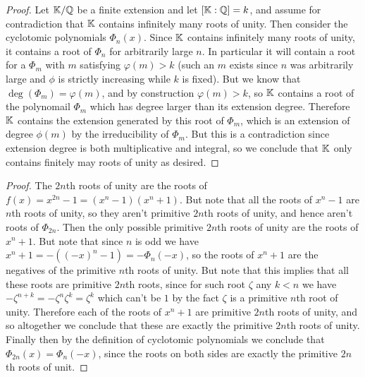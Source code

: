 \documentclass[11pt]{article}
\begin{document}
\begin{proof}
  Let $\mathbb{K}/\mathbb{Q}$ be a finite extension and let $[\mathbb{K}:\mathbb{Q}] = k$, and assume for contradiction that $\mathbb{K}$ contains infinitely many roots of unity.
  Then consider the cyclotomic polynomials $\Phi_n(x)$.
  Since $\mathbb{K}$ contains infinitely many roots of unity, it contains a root of $\Phi_n$ for arbitrarily large $n$.
  In particular it will contain a root for a $\Phi_m$ with $m$ satisfying $\varphi(m) > k$ (such an $m$ exists since $n$ was arbitrarily large and $\phi$ is strictly increasing while $k$ is fixed).
  But we know that $\deg(\Phi_m) = \varphi(m)$, and by construction $\varphi(m) > k$, so $\mathbb{K}$ contains a root of the polynomail $\Phi_m$ which has degree larger than its extension degree.
  Therefore $\mathbb{K}$ contains the extension generated by this root of $\Phi_m$, which is an extension of degree $\phi(m)$ by the irreducibility of $\Phi_m$.
  But this is a contradiction since extension degree is both multiplicative and integral, so we conclude that $\mathbb{K}$ only contains finitely may roots of unity as desired.
\end{proof}


\begin{proof}
  The $2n$th roots of unity are the roots of $f(x) = x^{2n}-1 = (x^n-1)(x^n+1)$.
  But note that all the roots of $x^n - 1$ are $n$th roots of unity, so they aren't primitive $2n$th roots of unity, and hence aren't roots of $\Phi_{2n}$.
  Then the only possible primitive $2n$th roots of unity are the roots of $x^n + 1$. But note that since $n$ is odd we have $x^n + 1 = -((-x)^n - 1) = -\Phi_n(-x)$, so the roots of $x^n + 1$ are the negatives of the primitive $n$th roots of unity.
  But note that this implies that all these roots are primitive $2n$th roots, since for such root $\zeta$ any $k < n$ we have $-\zeta^{n+k} = -\zeta^n\zeta^k = \zeta^k$ which can't be $1$ by the fact $\zeta$ is a primitive $n$th root of unity.
  Therefore each of the roots of $x^n + 1$ are primitive $2n$th roots of unity, and so altogether we conclude that these are exactly the primitive $2n$th roots of unity.
  Finally then by the definition of cyclotomic polynomials we conclude that $\Phi_{2n}(x) = \Phi_n(-x)$, since the roots on both sides are exactly the primitive $2n$th roots of unit.
\end{proof}
\end{document}
